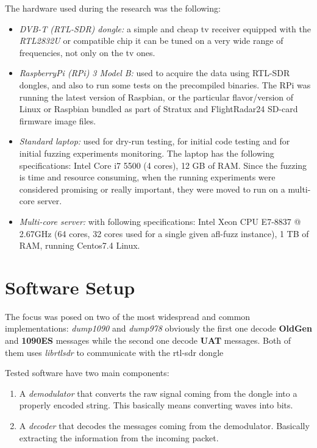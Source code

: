 \documentclass[../main.tex]{subfiles}
\begin{document}
The hardware used during the research was the following:
\begin{itemize}

\item \textit{DVB-T (RTL-SDR) dongle:} a simple and cheap tv receiver equipped with the \emph{RTL2832U} or compatible chip it can be tuned on a very wide range of frequencies, not only on the tv ones.

\item \textit{RaspberryPi (RPi) 3 Model B:} used to acquire the data using RTL-SDR dongles, and also to run some tests on the precompiled binaries. The RPi was running the latest version of Raspbian, or the particular flavor/version of Linux or Raspbian bundled as part of Stratux and FlightRadar24 SD-card firmware image files.

\item \textit{Standard laptop:} used for dry-run testing, for initial code testing and for initial fuzzing experiments monitoring. The laptop has the following specifications: Intel Core i7 5500 (4 cores), 12 GB of RAM. Since the fuzzing is time and resource consuming, when the running experiments were considered promising or really important, they were moved to run on a multi-core server.

\item \textit{Multi-core server:} with following specifications: Intel Xeon CPU E7-8837 @ 2.67GHz (64 cores, 32 cores used for a single given afl-fuzz instance), 1 TB of RAM, running Centos7.4 Linux.
\end{itemize}


\section{Software Setup}


The focus was posed on two of the most widespread and common implementations: \emph{dump1090} and \emph{dump978} obviously the first one decode \textbf{OldGen} and \textbf{1090ES} messages while the second one decode \textbf{UAT} messages. Both of them uses \emph{librtlsdr} to communicate with the rtl-sdr dongle

Tested software have two main components:
\begin{enumerate}
  \item A \emph{demodulator} that converts the raw signal coming from the dongle into a properly encoded string. This basically means converting waves into bits.
  \item A \emph{decoder} that decodes the messages coming from the demodulator. Basically extracting the information from the incoming packet.
\end{enumerate}
\end{document}
